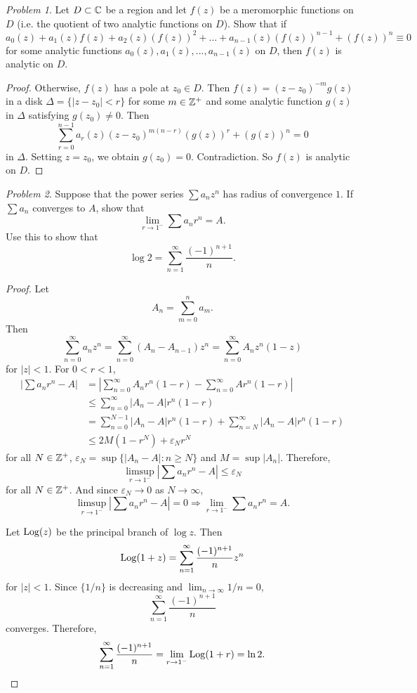 \documentclass[11pt]{amsart}
\theoremstyle{remark}
\newtheorem{prob}{Problem}[section]
\theoremstyle{definition}
\numberwithin{equation}{section}
\begin{document}
\begin{prob}
    Let $D \subset {\mathbb C}$ be a region and let $f(z)$
    be a meromorphic functions on $D$ (i.e. the quotient of two analytic functions on $D$). Show that if
    \[
        a_0(z) + a_1(z) f(z) + a_2(z) (f(z))^2 + ... + a_{n-1}(z) (f(z))^{n-1} + (f(z))^n \equiv 0
    \]
    for some analytic functions $a_0(z), a_1(z), ..., a_{n-1}(z)$ on $D$,
    then $f(z)$ is analytic on $D$.
\end{prob}

\begin{proof}
    Otherwise, $f(z)$ has a pole at $z_0\in D$. Then
    $f(z) = (z-z_0)^{-m} g(z)$ in a disk $\Delta = \{|z-z_0| < r\}$ for some $m\in {\mathbb Z}^+$ and some analytic function $g(z)$ in $\Delta$ satisfying $g(z_0)\ne 0$. Then
    \[
        \sum_{r=0}^{n-1} a_r(z) (z-z_0)^{m(n-r)} (g(z))^{r} + (g(z))^n = 0
    \]
    in $\Delta$. Setting $z = z_0$, we obtain $g(z_0) = 0$. Contradiction. So $f(z)$ is analytic on $D$.
\end{proof}

\begin{prob}
    Suppose that the power series $\sum a_n z^n$ has radius of convergence $1$.
    If $\sum a_n$ converges to $A$, show that
    \[
        \lim_{r\to 1^-} \sum a_n r^n = A.
    \]
    Use this to show that
    \[
        \log 2 = \sum_{n=1}^\infty \frac{(-1)^{n+1}}{n}.
    \]
\end{prob}

\begin{proof}
    Let
    \[
        A_n = \sum_{m=0}^n a_m.
    \]
    Then
    \[
        \sum_{n=0}^\infty a_n z^n = \sum_{n=0}^\infty (A_n - A_{n-1}) z^n
        = \sum_{n=0}^\infty A_n z^n(1-z)
    \]
    for $|z| < 1$. For $0 < r < 1$,
    \[
        \begin{aligned}
            \left|
            \sum a_n r^n - A
            \right| & = \left|\sum_{n=0}^\infty A_n r^n(1-r) - \sum_{n=0}^\infty A r^n(1-r)\right| \\
                    & \le \sum_{n=0}^\infty |A_n - A|r^n(1-r)
            \\
                    & = \sum_{n=0}^{N-1} |A_n - A|r^n(1-r) + \sum_{n=N}^\infty |A_n - A|r^n(1-r)   \\
                    & \le 2M(1-r^N) + \varepsilon_N r^N
        \end{aligned}
    \]
    for all $N\in {\mathbb Z}^+$, $\varepsilon_N = \sup\{|A_n-A|: n\ge N\}$
    and $M = \sup |A_n|$. Therefore,
    \[
        \limsup_{r\to 1^-} \left|
        \sum a_n r^n - A
        \right| \le \varepsilon_N
    \]
    for all $N\in {\mathbb Z}^+$. And since $\varepsilon_N\to 0$ as $N\to\infty$,
    \[
        \limsup_{r\to 1^-} \left|
        \sum a_n r^n - A
        \right| = 0 \Rightarrow \lim_{r\to 1^-} \sum a_n r^n = A.
    \]

    Let $\mathop{\mathrm{Log}}\nolimits(z)$ be the principal branch of $\log z$. Then
    \[
        \mathop{\mathrm{Log}}\nolimits (1+z) = \sum_{n=1}^\infty \frac{(-1)^{n+1}}{n} z^n
    \]
    for $|z| < 1$. Since $\{1/n\}$ is decreasing and $\lim_{n\to\infty} 1/n = 0$,
    \[
        \sum_{n=1}^\infty \frac{(-1)^{n+1}}{n}
    \]
    converges. Therefore,
    \[
        \sum_{n=1}^\infty \frac{(-1)^{n+1}}{n} = \lim_{r\to 1^-} \mathop{\mathrm{Log}}\nolimits(1+r) = \ln 2.
    \]
\end{proof}
\end{document}
